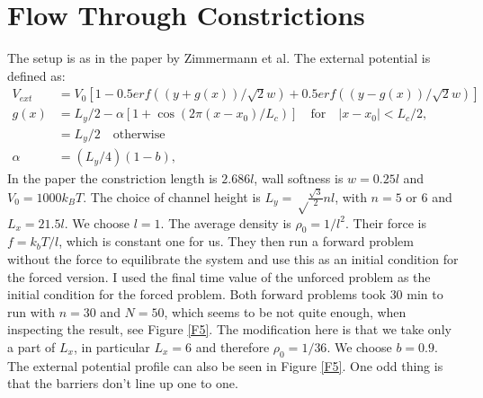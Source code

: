 \documentclass[11pt, a4paper]{article}
\theoremstyle{definition}
\begin{document}
	
	
	\section{Flow Through Constrictions}	
	The setup is as in the paper by Zimmermann et al.
	The external potential is defined as:
	\begin{align*}
	V_{ext} &= V_0 [1 - 0.5erf((y+g(x))/\sqrt 2 w) + 0.5erf((y-g(x))/\sqrt 2 w)]\\
	g(x) &= L_y /2 - \alpha [1+ \cos(2\pi (x - x_0)/L_c)] \quad \text{for} \quad |x - x_0| < L_c/2,\\
	&= L_y /2 \quad \text{otherwise}\\
	 \alpha &= (L_y/4)(1-b),
	\end{align*}
	In the paper the constriction length is $2.686 l$, wall softness is $w = 0.25 l$ and $V_0 = 1000 k_BT$. The choice of channel height is $L_y = \sqrt \frac{\sqrt 3}{2} n l$, with $n = 5$ or $6$  and $L_x = 21.5 l$.  We choose $l = 1$.
	The average density is $\rho_0 = 1/l^2$. Their force is $f = k_bT/l$, which is constant one for us.
	They then run a forward problem without the force to equilibrate the system and use this as an initial condition for the forced version.
	I used the final time value of the unforced problem as the initial condition for the forced problem. Both forward problems took $30$ min to run with $n = 30$ and $N = 50$, which seems to be not quite enough, when inspecting the result, see Figure \ref{F5}. The modification here is that we take only a part of $L_x$, in particular $L_x = 6$ and therefore $\rho_0 = 1/36$. We choose $b = 0.9$. The external potential profile can also be seen in Figure \ref{F5}. One odd thing is that the barriers don't line up one to one.
	
\end{document}
